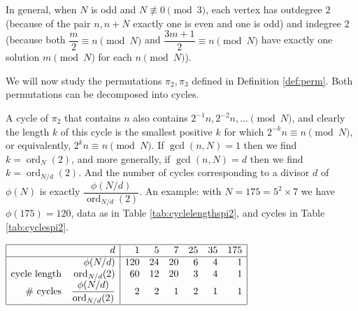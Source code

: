 \documentclass[10pt]{article}
\theoremstyle{definition}
\DeclareMathOperator{\ord}{ord}
\begin{document}
In general, when $ N $ is odd and $ N \not\equiv 0 \pmod{3} $, each vertex has outdegree $ 2 $ (because
of the pair $ n, n+N $ exactly one is even and one is odd) and indegree $ 2 $ (because both
$ \dfrac{m}{2} \equiv n \pmod{N} $ and $ \dfrac{3m+1}{2} \equiv n \pmod{N} $ have exactly one solution
$ m \pmod{N} $ for each $ n \pmod{N} $).

We will now study the permutations $ \pi_2, \pi_3 $ defined in Definition \ref{def:perm}. Both permutations
can be decomposed into cycles.

A cycle of $ \pi_2 $ that contains $ n $ also contains $ 2^{-1}n, 2^{-2}n, \ldots \pmod{N} $, and
clearly the length $ k $ of this cycle is the smallest positive $ k $ for which
$ 2^{-k} n \equiv n \pmod{N} $, or equivalently, $ 2^k n \equiv n \pmod{N} $. If $ \gcd(n,N) = 1 $
then we find $ k = \ord_N(2) $, and more generally, if $ \gcd(n,N) = d $ then we find
$ k = \ord_{N/d}(2) $. And the number of cycles corresponding to a divisor $ d $ of $ \phi(N) $ is
exactly $ \dfrac{\phi(N/d)}{\ord_{N/d}(2)} $. An example: with $ N = 175 = 5^2 \times 7 $ we have
$ \phi(175) = 120 $, data as in Table \ref{tab:cyclelengthspi2}, and cycles in Table \ref{tab:cyclespi2}.

\begin{table}[ht]
    \centering
    $ \begin{array}{|rr|rrrrrr|} \hline
        &                                d &   1 &  5 &  7 & 25 & 35 & 175 \\ \hline
        &                        \phi(N/d) & 120 & 24 & 20 &  6 &  4 &   1 \\
        \text{cycle length} &                    \ord_{N/d}(2) &  60 & 12 & 20 &  3 &  4 &   1 \\
        \text{\# cycles}    & \dfrac{\phi(N/d)}{\ord_{N/d}(2)} &   2 &  2 &  1 &  2 &  1 &   1 \\ \hline
    \end{array} $
    \caption{Cycle lengths and counts for $ \pi_2 $ for $ N = 175 $.}
    \label{tab:cyclelengthspi2}
\end{table}
\end{document}

